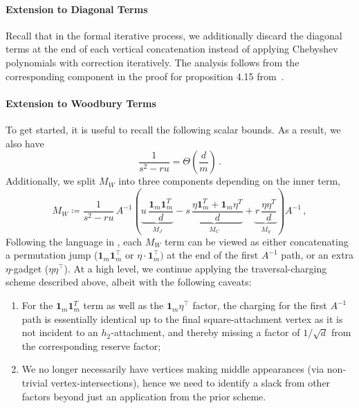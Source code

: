 \documentclass[12pt]{article}
\def\1{\bm{1}}
\newcommand{\todo}[1]{\textcolor{red}{(#1)}}
\begin{document}

\paragraph{Extension to Diagonal Terms} Recall that in the formal iterative process, we additionally discard the diagonal terms at the end of each vertical concatenation instead of applying Chebyshev polynomials with correction iteratively. The analysis follows from the corresponding component in the proof for proposition 4.15 from~\cite{HKPX23}.

\paragraph{Extension to Woodbury Terms} To get started, it is useful to recall the following scalar bounds. \HyperParameterBounds*
As a result, we also have\[
\frac{1}{s^2 - ru } = \Theta \left(\frac{d}{m}\right)\,.
 \]
Additionally, we split $M_W$ into three components depending on the inner term, 
\[
	M_W \coloneqq  \frac{1}{s^2-ru}\, A^{-1} \left( \underbrace{ u\,\frac{\1_m\1_m^T}{d}}_{M_J} -  \underbrace{s\,\frac{\eta\1_m^T+\1_m\eta^T}{d}}_{M_C} + \underbrace{r\,\frac{ \eta\eta^T}{d} }_{M_\eta} \right) A^{-1}
	 \,,\]
Following the language in \cite{HKPX23}, each $M_W$ term can be viewed as either concatenating a permutation jump ($\1_m \1_m^\top$ or $\eta\cdot \1_m^\top)$ at the end of the first $A^{-1}$ path, or an extra $\eta$-gadget ($\eta\eta^\top$).
At a high level, we continue applying the traversal-charging scheme described above, albeit with the following caveats:
\begin{enumerate}
	\item For the $\1_m\1_m^T$ term as well as the $\1_m\eta^\top$ factor, the charging for the  first $A^{-1}$ path is essentially identical up to the final square-attachment vertex as it is not incident to an $h_2$-attachment, and thereby missing a factor of $1/\sqrt{d}$ from the corresponding reserve factor;
	\item We no longer necessarily have vertices making middle appearances (via non-trivial vertex-intersections), hence we need to identify a slack from other factors beyond just an application from the prior scheme.
\end{enumerate}
\end{document}
